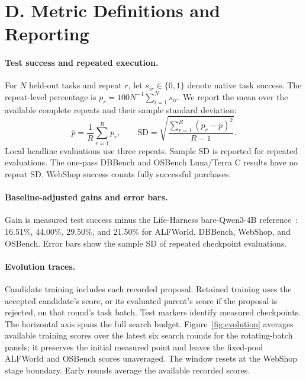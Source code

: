 \clearpage
\section*{D. Metric Definitions and Reporting}
\label{app:metrics}
\paragraph{Test success and repeated execution.}
For $N$ held-out tasks and repeat $r$, let $s_{ir}\in\{0,1\}$ denote native task success. The repeat-level percentage is $p_r=100N^{-1}\sum_{i=1}^{N}s_{ir}$. We report the mean over the available complete repeats and their sample standard deviation:
\[
\bar p=\frac{1}{R}\sum_{r=1}^{R}p_r,\qquad
\mathrm{SD}=\sqrt{\frac{\sum_{r=1}^{R}(p_r-\bar p)^2}{R-1}}.
\]
Local headline evaluations use three repeats. Sample SD is reported for repeated evaluations. The one-pass DBBench and OSBench Luna/Terra C results have no repeat SD. WebShop success counts fully successful purchases.

\paragraph{Baseline-adjusted gains and error bars.}
Gain is measured test success minus the Life-Harness bare-Qwen3-4B reference~\citep{life}: 16.51\%, 44.00\%, 29.50\%, and 21.50\% for ALFWorld, DBBench, WebShop, and OSBench. Error bars show the sample SD of repeated checkpoint evaluations.

\paragraph{Evolution traces.}
Candidate training includes each recorded proposal. Retained training uses the accepted candidate's score, or its evaluated parent's score if the proposal is rejected, on that round's task batch. Test markers identify measured checkpoints. The horizontal axis spans the full search budget. Figure~\ref{fig:evolution} averages available training scores over the latest six search rounds for the rotating-batch panels; it preserves the initial measured point and leaves the fixed-pool ALFWorld and OSBench scores unaveraged. The window resets at the WebShop stage boundary. Early rounds average the available recorded scores.
